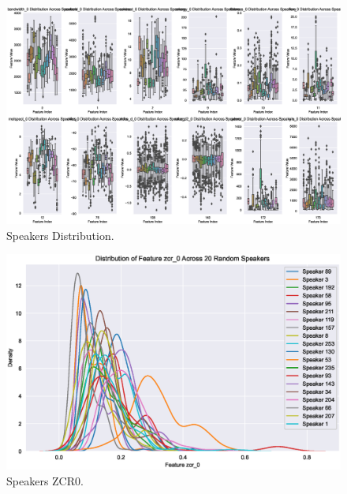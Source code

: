\begin{figure}[!ht]
	\centering
	\includegraphics[scale=0.3]{fig/speakers_dist}
	\vspace{-0.3cm}
	\caption{Speakers Distribution.}
	\label{fig:SpeakersDistribution}
	\vspace{-0.1cm}
\end{figure}

\begin{figure}[!ht]
	\centering
	\includegraphics[scale=0.3]{fig/speakers_zcr0}
	\vspace{-0.3cm}
	\caption{Speakers ZCR0.}
	\label{fig:SpeakersZCR0}
	\vspace{-0.1cm}
\end{figure}
